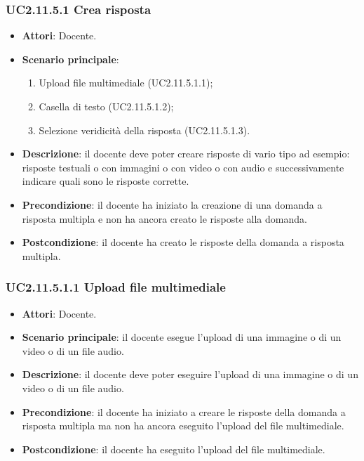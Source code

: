 \subsubsection{UC2.11.5.1 Crea risposta}
\begin{itemize}
\item \textbf{Attori}: Docente.
\item \textbf{Scenario principale}:
\begin{enumerate}
\item Upload file multimediale (UC2.11.5.1.1);
\item Casella di testo (UC2.11.5.1.2);
\item Selezione veridicità della risposta (UC2.11.5.1.3).
\end{enumerate}
\item \textbf{Descrizione}: il docente deve poter creare risposte di vario tipo ad esempio: risposte testuali o con immagini o con video o con audio e successivamente indicare quali sono le risposte corrette.
\item \textbf{Precondizione}: il docente ha iniziato la creazione di una domanda a risposta multipla e non ha ancora creato le risposte alla domanda.
\item \textbf{Postcondizione}: il docente ha creato le risposte della domanda a risposta multipla.
\end{itemize}
\subsubsection{UC2.11.5.1.1 Upload file multimediale}
\begin{itemize}
\item \textbf{Attori}: Docente.
\item \textbf{Scenario principale}: il docente esegue l'upload di una immagine o di un video o di un file audio.
\item \textbf{Descrizione}: il docente deve poter eseguire l'upload di una immagine o di un video o di un file audio.
\item \textbf{Precondizione}: il docente ha iniziato a creare le risposte della domanda a risposta multipla ma non ha ancora eseguito l'upload del file multimediale.
\item \textbf{Postcondizione}: il docente ha eseguito l'upload del file multimediale.
\end{itemize}
